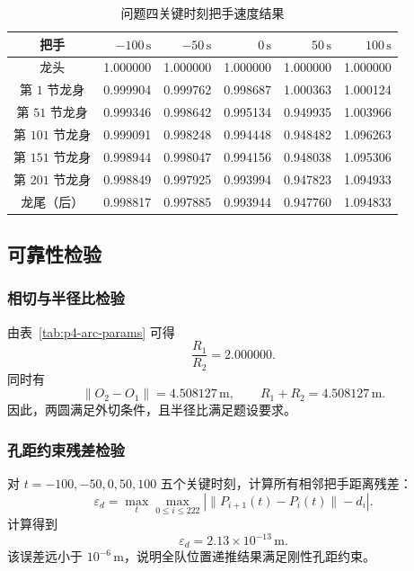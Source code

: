\begin{table}[H]
    \centering
    \caption{问题四关键时刻把手速度结果}
    \label{tab:p4-speed-result}
    \begin{tabular}{c r r r r r}
        \toprule
        把手 & $-100\,\mathrm{s}$ & $-50\,\mathrm{s}$ & $0\,\mathrm{s}$ & $50\,\mathrm{s}$ & $100\,\mathrm{s}$ \\
        \midrule
        龙头 & 1.000000 & 1.000000 & 1.000000 & 1.000000 & 1.000000 \\
        第 $1$ 节龙身 & 0.999904 & 0.999762 & 0.998687 & 1.000363 & 1.000124 \\
        第 $51$ 节龙身 & 0.999346 & 0.998642 & 0.995134 & 0.949935 & 1.003966 \\
        第 $101$ 节龙身 & 0.999091 & 0.998248 & 0.994448 & 0.948482 & 1.096263 \\
        第 $151$ 节龙身 & 0.998944 & 0.998047 & 0.994156 & 0.948038 & 1.095306 \\
        第 $201$ 节龙身 & 0.998849 & 0.997925 & 0.993994 & 0.947823 & 1.094933 \\
        龙尾（后） & 0.998817 & 0.997885 & 0.993944 & 0.947760 & 1.094833 \\
        \bottomrule
    \end{tabular}
\end{table}

\subsection{可靠性检验}

\subsubsection{相切与半径比检验}

由表~\ref{tab:p4-arc-params} 可得
\[
    \frac{R_1}{R_2}=2.000000.
\]
同时有
\[
    \|O_2-O_1\|=4.508127\,\mathrm{m},\qquad R_1+R_2=4.508127\,\mathrm{m}.
\]
因此，两圆满足外切条件，且半径比满足题设要求。

\subsubsection{孔距约束残差检验}

对 $t=-100,-50,0,50,100$ 五个关键时刻，计算所有相邻把手距离残差：
\begin{equation}
    \varepsilon_d=
    \max_t\max_{0\le i\le222}
    \left|\|P_{i+1}(t)-P_i(t)\|-d_i\right|.
    \label{eq:p4-distance-error}
\end{equation}
计算得到
\[
    \varepsilon_d=2.13\times10^{-13}\,\mathrm{m}.
\]
该误差远小于 $10^{-6}\,\mathrm{m}$，说明全队位置递推结果满足刚性孔距约束。

